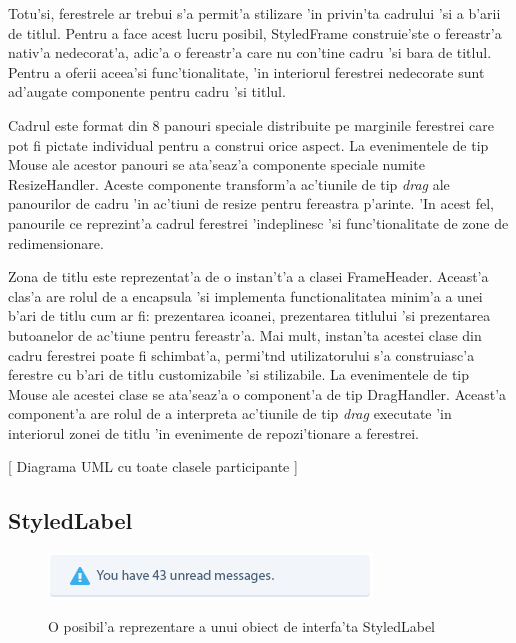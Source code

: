 \medskip

Totu'si, ferestrele ar trebui s'a permit'a stilizare 'in privin'ta cadrului 'si a b'arii de titlul. Pentru a face acest lucru posibil, StyledFrame construie'ste o fereastr'a nativ'a nedecorat'a, adic'a o fereastr'a care nu con'tine cadru 'si bara de titlul. Pentru a oferii aceea'si func'tionalitate, 'in interiorul ferestrei nedecorate sunt ad'augate componente pentru cadru 'si titlul. 

\medskip

Cadrul este format din 8 panouri speciale distribuite pe marginile ferestrei care pot fi pictate individual pentru a construi orice aspect. La evenimentele de tip Mouse ale acestor panouri se ata'seaz'a componente speciale numite ResizeHandler. Aceste componente transform'a ac'tiunile de tip \emph{drag} ale panourilor de cadru 'in ac'tiuni de resize pentru fereastra p'arinte. 'In acest fel, panourile ce reprezint'a cadrul ferestrei 'indeplinesc 'si func'tionalitate de zone de redimensionare.

\medskip

Zona de titlu este reprezentat'a de o instan't'a a clasei FrameHeader. Aceast'a clas'a are rolul de a encapsula 'si implementa functionalitatea minim'a a unei b'ari de titlu cum ar fi: prezentarea icoanei, prezentarea titlului 'si prezentarea butoanelor de ac'tiune pentru fereastr'a. Mai mult, instan'ta acestei clase din cadru ferestrei poate fi schimbat'a, permi't{\ia}nd utilizatorului s'a construiasc'a ferestre cu b'ari de titlu customizabile 'si stilizabile. La evenimentele de tip Mouse ale acestei clase se ata'seaz'a o component'a de tip DragHandler. Aceast'a component'a are rolul de a interpreta ac'tiunile de tip \emph{drag} executate 'in interiorul zonei de titlu 'in evenimente de repozi'tionare a ferestrei.

\medskip

[ Diagrama UML cu toate clasele participante ]


\subsection{StyledLabel}

\begin{center}
\begin{figure}[h]
    \centering
    \includegraphics{img/ch5_styledlabel.png}
    \label{fig:fig_5_1}
    \caption{O posibil'a reprezentare a unui obiect de interfa'ta StyledLabel}
\end{figure}
\end{center}

